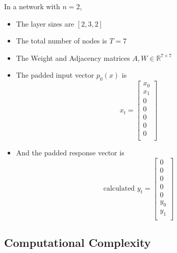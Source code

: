 In a network with $n=2$,
\begin{itemize}
    \item The layer sizes are $[2, 3, 2]$
    \item The total number of nodes is $T = 7$
    \item The Weight and Adjacency matrices $A, W \in \mathbb{R}^{7 \times 7}$
    \item The padded input vector $p_0(x)$ is
    \[x_t = \begin{bmatrix}
        x_0 \\
        x_1 \\
        0 \\
        0 \\
        0 \\
        0 \\
        0 \\
    \end{bmatrix}\]

    \item And the padded response vector is
    \[\text{calculated } y_t = \begin{bmatrix}
        0 \\
        0 \\
        0 \\
        0 \\
        0 \\
        y_0 \\
        y_1 \\
    \end{bmatrix}\]
    
\end{itemize}


\subsection{Computational Complexity}


